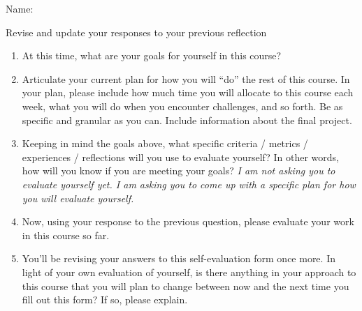 \documentclass[12pt,letterpaper,noanswers]{exam}
\begin{document}
 \pdfpageheight 11in 
  \pdfpagewidth 8.5in
\noindent  Name:
\vspace{0.2cm}

\noindent Revise and update your responses to your previous reflection

\begin{enumerate}
    \item At this time, what are your goals for yourself in this course?
    \vspace{1.7in}
    
\item Articulate your current plan for how you will “do” the rest of this course. In your plan, please include how much time you will allocate to this course each week, what you will do when you encounter challenges, and so forth. Be as specific and granular as you can.  Include information about the final project.

\vspace{3in}
\eject 
\item Keeping in mind the goals above, what specific criteria / metrics / experiences / reflections will you use to evaluate yourself? In other words, how will you know if you are meeting your goals? \emph{I am not asking you to evaluate yourself yet. I am asking you to come up with a specific plan for how you will evaluate yourself.}
\vspace{3in}

\item Now, using your response to the previous question, please evaluate your work in this course so far.
\vspace{2.5in}
\item You'll be revising your answers to this self-evaluation form once more. In light of your own evaluation of yourself, is there anything in your approach to this course that you will plan to change between now and the next time you fill out this form? If so, please explain.
\end{enumerate}
\end{document}
